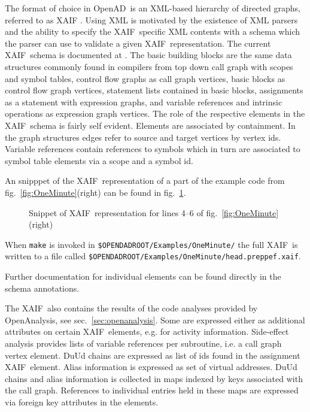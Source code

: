 \documentclass{book}
\newcommand{\OpenAD}{OpenAD}
\newcommand{\OpenAnalysis}{OpenAnalysis}
\newcommand{\xaif}{XAIF}
\newcommand{\refsec}[1]{{sec.~\ref{#1}}}
\newcommand{\reffig}[1]{{fig.~\ref{#1}}}
\begin{document}
The format of choice in \OpenAD\ is an XML-based \cite{xmlWeb} hierarchy of 
directed graphs, referred to as \xaif 
\cite{Hovland2002AXB}. Using XML is motivated by the existence of XML parsers and 
the ability to specify the \xaif\ specific XML contents with a schema which 
the parser can use to validate a given \xaif\ representation. 
The current \xaif\ schema is documented at \cite{xaifweb}.
The basic building blocks are the same data structures commonly found 
in compilers from top down call graph with scopes and symbol tables, 
control flow graphs as call graph vertices, basic blocks  as control flow 
graph vertices, statement lists contained in basic blocks, 
assignments as a statement with expression graphs,  and variable references 
and intrinsic operations as expression graph vertices. 
The role of the respective elements in the \xaif\ schema is fairly self evident. 
Elements are associated by containment. In the graph structures edges 
refer to source and target vertices by vertex ids. 
Variable references contain references to symbols which in turn 
are associated to symbol table elements via a scope and a symbol id. 

An snipppet of the \xaif\ representation of a part of the 
example code  from \reffig{fig:OneMinute}(right) can be found in  
\reffig{fig:wtxxtwXaif}. 
\begin{figure}[h]
\small
{}

  \caption{Snippet of \xaif\ representation for lines 4--6 of \reffig{fig:OneMinute}(right)}\label{fig:wtxxtwXaif}
\end{figure}
When \lstinline{make} is invoked in \lstinline{$OPENDADROOT/Examples/OneMinute/}%
the full \xaif\ is written to a file called \lstinline{$OPENDADROOT/Examples/OneMinute/head.preppef.xaif}.%

Further documentation for individual elements can be found directly in the 
schema annotations. 

The \xaif\ also contains the results of the code analyses provided 
by \OpenAnalysis, see \refsec{sec:openanalysis}. Some are expressed 
either as additional attributes on certain \xaif\ elements, e.g. for activity information. 
Side-effect analysis provides lists of variable references per subroutine, i.e. a call graph vertex element.
DuUd chains are expressed as list of ids found in the assignment \xaif\ element.
Alias information is expressed as set of virtual addresses. 
DuUd chains and alias information is collected in maps indexed by keys associated with the call 
graph. References to individual entries held in these maps are expressed via foreign key 
attributes in the elements. 
\end{document}
